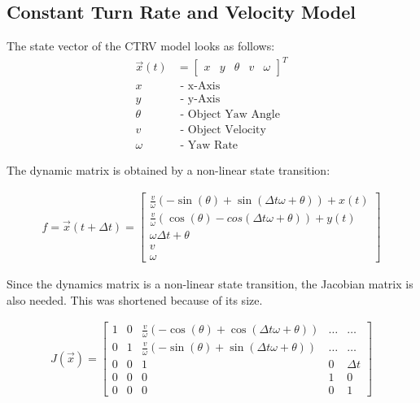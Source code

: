 \documentclass[11pt,oneside,openright]{mpreport}
\begin{document}
\subsection{Constant Turn Rate and Velocity Model}
The state vector \cite{Schubert2008} of the CTRV model looks as follows:
\begin{align*}
\vec{x}(t) &=
\begin{bmatrix}
x & y & \theta & v & \omega
\end{bmatrix}^T\\
x &\text{ - x-Axis}\\
y &\text{ - y-Axis}\\
\theta &\text{ - Object Yaw Angle}\\
v &\text{ - Object Velocity}\\
\omega &\text{ - Yaw Rate}
\end{align*}

The dynamic matrix is obtained by a non-linear state transition:

\begin{align*}
f = \vec{x}(t + \Delta t)=
\begin{bmatrix}
\frac{v}{\omega} (-\sin(\theta) + \sin(\Delta t \omega + \theta)) + x(t) \\
\frac{v}{\omega} (\cos(\theta) - cos(\Delta t \omega + \theta)) + y(t) \\
\omega \Delta t + \theta\\
v\\
\omega
\end{bmatrix} 
\end{align*}

Since the dynamics matrix is a non-linear state transition, the Jacobian matrix is also needed. This was shortened because of its size.
 
 
\begin{align*}
J(\vec{x})=
\begin{bmatrix}
1 & 0 & \frac{v}{\omega} (-\cos(\theta) + \cos(\Delta t \omega + \theta))& \dots & \dots \\
0 & 1 & \frac{v}{\omega} (-\sin(\theta) + \sin(\Delta t \omega + \theta))& \dots & \dots \\
0 & 0 & 1 & 0 & \Delta t\\
0 & 0 & 0 & 1 & 0\\
0 & 0 & 0 & 0 & 1
\end{bmatrix} 
\end{align*}
\end{document}

